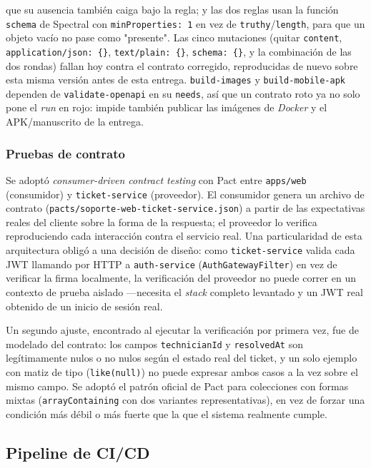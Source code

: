 que su ausencia también caiga bajo la regla; y las dos reglas usan la función \texttt{schema} de
Spectral con \texttt{minProperties: 1} en vez de \texttt{truthy}/\texttt{length}, para que un
objeto vacío no pase como "presente". Las cinco mutaciones (quitar \texttt{content},
\texttt{application/json: \{\}}, \texttt{text/plain: \{\}}, \texttt{schema: \{\}}, y la
combinación de las dos rondas) fallan hoy contra el contrato corregido, reproducidas de nuevo
sobre esta misma versión antes de esta entrega. \texttt{build-images} y \texttt{build-mobile-apk}
dependen de
\texttt{validate-openapi} en su \texttt{needs}, así que un contrato roto ya no solo pone el
\emph{run} en rojo: impide también publicar las imágenes de \emph{Docker} y el APK/manuscrito de
la entrega.

\subsubsection{Pruebas de contrato}

Se adoptó \emph{consumer-driven contract testing} con Pact entre \texttt{apps/web} (consumidor) y
\texttt{ticket-service} (proveedor). El consumidor genera un archivo de contrato
(\texttt{pacts/soporte-web-ticket-service.json}) a partir de las expectativas reales del cliente
sobre la forma de la respuesta; el proveedor lo verifica reproduciendo cada interacción contra el
servicio real. Una particularidad de esta arquitectura obligó a una decisión de diseño: como
\texttt{ticket-service} valida cada JWT llamando por HTTP a \texttt{auth-service}
(\texttt{AuthGatewayFilter}) en vez de verificar la firma localmente, la verificación del
proveedor no puede correr en un contexto de prueba aislado —necesita el \emph{stack} completo
levantado y un JWT real obtenido de un inicio de sesión real.

Un segundo ajuste, encontrado al ejecutar la verificación por primera vez, fue de modelado del
contrato: los campos \texttt{technicianId} y \texttt{resolvedAt} son legítimamente nulos o no
nulos según el estado real del ticket, y un solo ejemplo con matiz de tipo (\texttt{like(null)})
no puede expresar ambos casos a la vez sobre el mismo campo. Se adoptó el patrón oficial de Pact
para colecciones con formas mixtas (\texttt{arrayContaining} con dos variantes representativas),
en vez de forzar una condición más débil o más fuerte que la que el sistema realmente cumple.

\subsection{Pipeline de CI/CD}

